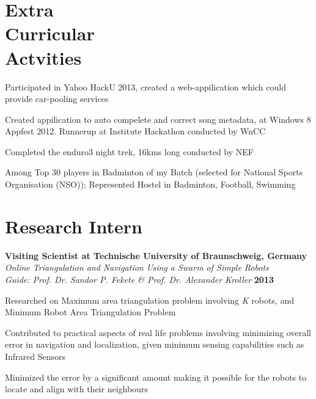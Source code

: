 \documentclass[margin,11pt]{resume}
\begin{document}
\begin{resume}
\section{\mysidestyle Extra\\Curricular\\Actvities}
\begin{list2}
\item Participated in  Yahoo HackU  2013, created a web-appilication which could provide car-pooling services
\item Created appilication to  auto compelete and correct song metadata, at Windows 8 Appfest 2012. Runnerup at Institute Hackathon conducted by WnCC
\item Completed the enduro3 night trek, 16kms long conducted by NEF
\item Among Top 30 players in Badminton of my Batch (selected for National Sports Organisation (NSO)); Represented Hostel in Badminton, Football, Swimming
\end{list2}

\vspace{-3mm}

\section{\mysidestyle Research Intern}
				\textbf{Visiting Scientist at  Technische University of Braunschweig, Germany\\} \emph{Online Triangulation and Navigation Using a Swarm of Simple Robots}\\
				\emph{Guide: Prof. Dr. Sandor P. Fekete \& Prof. Dr. Alexander Kroller} \hfill {\textbf{2013}} \vspace{-4mm}\\
				\begin{list2}	
				\item Researched on Maximum area triangulation problem involving \emph{K} robots, and Minimum Robot Area Triangulation Problem
				\item Contributed to practical aspects of real life problems involving minimizing overall error in navigation and localization, given minimum sensing capabilities such as Infrared Sensors
				\item Minimized the error by a significant amount making it possible for the robots to locate and align with their neighbours
				\end{list2}
\vspace{-3mm}

\end{resume}
\end{document}

